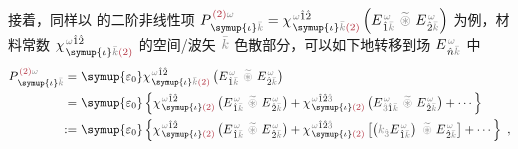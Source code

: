 接着，同样以  的二阶非线性项 $P^{\;\! \textcolor{Maroon}{(2)} \mathcolor{gray}{\omega}}_{\;\! \symup{\iota}\mathcolor{gray}{\bar{k}}} = \chi^{\;\! \mathcolor{gray}{\omega} \hat{1} \hat{2}}_{\;\! \symup{\iota} \mathcolor{gray}{\bar{k}} \textcolor{Maroon}{(2)}} \left( E^{\;\!\mathcolor{gray}{\omega}}_{\;\! \hat{1} \mathcolor{gray}{\bar{k}}} ~\mathcolor{gray}{\widetilde \circledast}~ E^{\;\!\mathcolor{gray}{\omega}}_{\;\! \hat{2} \mathcolor{gray}{\bar{k}}} \right)$ 为例，材料常数 $\chi^{\;\! \mathcolor{gray}{\omega} \hat{1} \hat{2}}_{\;\! \symup{\iota} \mathcolor{gray}{\bar{k}} \textcolor{Maroon}{(2)}}$ 的空间/波矢 $\mathcolor{gray}{\bar{k}}$ 色散部分，可以如下地转移到场 $E^{\;\!\mathcolor{gray}{\omega}}_{\;\! \hat{n} \mathcolor{gray}{\bar{k}}}$ 中
\begin{subequations}
\begin{align}
	P^{\;\! \textcolor{Maroon}{(2)} \mathcolor{gray}{\omega}}_{\;\! \symup{\iota}\mathcolor{gray}{\bar{k}}} =&~ {\symup{\varepsilon_0}} \chi^{\;\! \mathcolor{gray}{\omega} \hat{1} \hat{2}}_{\;\! \symup{\iota} \mathcolor{gray}{\bar{k}} \textcolor{Maroon}{(2)}} \left( E^{\;\!\mathcolor{gray}{\omega}}_{\;\! \hat{1} \mathcolor{gray}{\bar{k}}} ~\mathcolor{gray}{\widetilde \circledast}~ E^{\;\!\mathcolor{gray}{\omega}}_{\;\! \hat{2} \mathcolor{gray}{\bar{k}}} \right) \\ =&~ {\symup{\varepsilon_0}} \left\{ \chi^{\;\! \mathcolor{gray}{\omega} \hat{1} \hat{2}}_{\;\! \symup{\iota} \textcolor{Maroon}{(2)}} \left( E^{\;\!\mathcolor{gray}{\omega}}_{\;\! \hat{1} \mathcolor{gray}{\bar{k}}} ~\mathcolor{gray}{\widetilde \circledast}~ E^{\;\!\mathcolor{gray}{\omega}}_{\;\! \hat{2} \mathcolor{gray}{\bar{k}}} \right) + \chi^{\;\! \mathcolor{gray}{\omega} \hat{1} \hat{2} \mathcolor{gray}{\hat{3}}}_{\;\! \symup{\iota} \textcolor{Maroon}{(2)}} \left( E^{\;\!\mathcolor{gray}{\omega}}_{\;\! \mathcolor{gray}{\hat{3}} \hat{1} \mathcolor{gray}{\bar{k}}} ~\mathcolor{gray}{\widetilde \circledast}~ E^{\;\!\mathcolor{gray}{\omega}}_{\;\! \hat{2} \mathcolor{gray}{\bar{k}}} \right) + \cdots \right\} \label{eq:P(2)_wk}
	\\ :=&~ {\symup{\varepsilon_0}} \left\{ \chi^{\;\! \mathcolor{gray}{\omega} \hat{1} \hat{2}}_{\;\! \symup{\iota} \textcolor{Maroon}{(2)}} \left( E^{\;\!\mathcolor{gray}{\omega}}_{\;\! \hat{1} \mathcolor{gray}{\bar{k}}} ~\mathcolor{gray}{\widetilde \circledast}~ E^{\;\!\mathcolor{gray}{\omega}}_{\;\! \hat{2} \mathcolor{gray}{\bar{k}}} \right) + \chi^{\;\! \mathcolor{gray}{\omega} \hat{1} \hat{2} \mathcolor{gray}{\hat{3}}}_{\;\! \symup{\iota} \textcolor{Maroon}{(2)}} \left[ \left( \mathcolor{gray}{k_{\hat{3}}} E^{\;\!\mathcolor{gray}{\omega}}_{\;\! \hat{1} \mathcolor{gray}{\bar{k}}} \right) ~\mathcolor{gray}{\widetilde \circledast}~ E^{\;\!\mathcolor{gray}{\omega}}_{\;\! \hat{2} \mathcolor{gray}{\bar{k}}} \right] + \cdots \right\}~,
\end{align}
\end{subequations}
